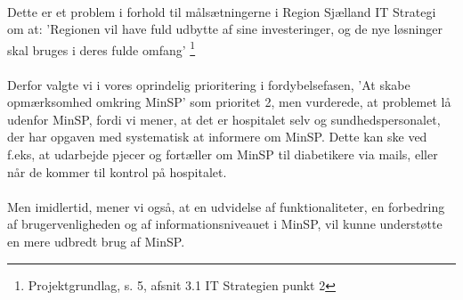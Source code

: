 \\
Dette er et problem i forhold til målsætningerne i Region Sjælland IT Strategi om at: 'Regionen vil have fuld udbytte af sine investeringer, og de nye løsninger skal bruges i deres fulde omfang' \footnote{Projektgrundlag, s. 5, afsnit 3.1 IT Strategien punkt 2}\\
\\
Derfor valgte vi i vores oprindelig prioritering i fordybelsefasen, 'At skabe opmærksomhed omkring MinSP' som prioritet 2, men vurderede, at problemet lå udenfor MinSP, fordi vi mener, at det er hospitalet selv og sundhedspersonalet, der har opgaven med systematisk at informere om MinSP. Dette kan ske ved f.eks, at udarbejde pjecer og fortæller om MinSP til diabetikere via mails, eller når de kommer til kontrol på hospitalet. \\
\\
Men imidlertid, mener vi også, at en udvidelse af funktionaliteter, en forbedring af brugervenligheden og af informationsniveauet i MinSP, vil kunne understøtte en mere udbredt brug af MinSP.
